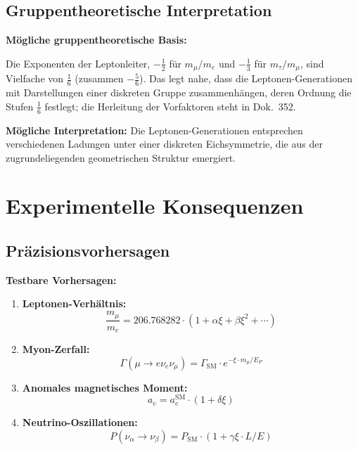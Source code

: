 	\subsection{Gruppentheoretische Interpretation}
	
	\begin{abhandlung}
		\textbf{Mögliche gruppentheoretische Basis:}
		
		Die Exponenten der Leptonleiter, $-\tfrac12$ für $m_\mu/m_e$ und $-\tfrac13$ für $m_\tau/m_\mu$, sind Vielfache von $\tfrac16$ (zusammen $-\tfrac56$). Das legt nahe, dass die Leptonen-Generationen mit Darstellungen einer diskreten Gruppe zusammenhängen, deren Ordnung die Stufen $\tfrac16$ festlegt; die Herleitung der Vorfaktoren steht in Dok.~352.
		
		
		\textbf{Mögliche Interpretation:}
		Die Leptonen-Generationen entsprechen verschiedenen Ladungen unter einer diskreten Eichsymmetrie, die aus der zugrundeliegenden geometrischen Struktur emergiert.
	\end{abhandlung}

	\section{Experimentelle Konsequenzen}
	
	\subsection{Präzisionsvorhersagen}
	
	\begin{anwendung}
		\textbf{Testbare Vorhersagen:}
		
		\begin{enumerate}
			\item \textbf{Leptonen-Verhältnis:}
			\begin{equation}
				\frac{m_\mu}{m_e} = 206.768282 \cdot (1 + \alpha \xi + \beta \xi^2 + \cdots)
			\end{equation}
			
			\item \textbf{Myon-Zerfall:}
			\begin{equation}
				\Gamma(\mu \to e\nu_e\nu_\mu) = \Gamma_{\text{SM}} \cdot e^{-\xi \cdot m_\mu/E_P}
			\end{equation}
			
			\item \textbf{Anomales magnetisches Moment:}
			\begin{equation}
				a_e = a_e^{\text{SM}} \cdot (1 + \delta \xi)
			\end{equation}
			
			\item \textbf{Neutrino-Oszillationen:}
			\begin{equation}
				P(\nu_\alpha \to \nu_\beta) = P_{\text{SM}} \cdot (1 + \gamma \xi \cdot L/E)
			\end{equation}
		\end{enumerate}
	\end{anwendung}
	
